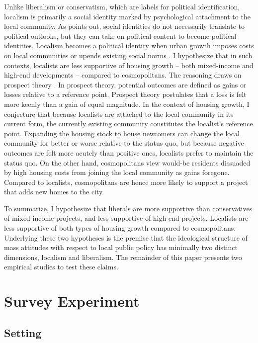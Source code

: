 \documentclass[article,12pt]{memoir}
\begin{document}
Unlike liberalism or conservatism, which are labels for political identification, localism is primarily a social identity marked by psychological attachment to the local community. As \citet{huddy_group_2013} points out, social identities do not necessarily translate to political outlooks, but they can take on political content to become political identities. Localism becomes a political identity when urban growth imposes costs on local communities \citep{mollenkopf_neighbourhood_1981} or upends existing social norms \citep[chap. 8]{kohn_death_2016}. I hypothesize that in such contexts, localists are less supportive of housing growth -- both mixed-income and high-end developments -- compared to cosmopolitans. The reasoning draws on prospect theory \citep{kahneman_prospect_1979}. In prospect theory, potential outcomes are defined as gains or losses relative to a reference point. Prospect theory postulates that a loss is felt more keenly than a gain of equal magnitude. In the context of housing growth, I conjecture that because localists are attached to the local community in its current form, the currently existing community constitutes the localist's reference point. Expanding the housing stock to house newcomers can change the local community for better or worse relative to the status quo, but because negative outcomes are felt more acutely than positive ones, localists prefer to maintain the status quo. On the other hand, cosmopolitans view would-be residents dissuaded by high housing costs from joining the local community as gains foregone. Compared to localists, cosmopolitans are hence more likely to support a project that adds new homes to the city.

To summarize, I hypothesize that liberals are more supportive than conservatives of mixed-income projects, and less supportive of high-end projects. Localists are less supportive of both types of housing growth compared to cosmopolitans. Underlying these two hypotheses is the premise that the ideological structure of mass attitudes with respect to local public policy has minimally two distinct dimensions, localism and liberalism. The remainder of this paper presents two empirical studies to test these claims.

\section{Survey Experiment}\label{sec:hg_exp}

\subsection{Setting}
\end{document}
